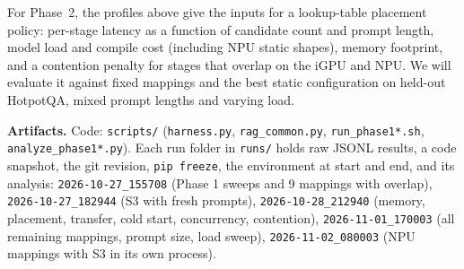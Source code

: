 \documentclass[10pt]{article}
\begin{document}
For Phase~2, the profiles above give the inputs for a lookup-table placement policy: per-stage latency as a
function of candidate count and prompt length, model load and compile cost (including NPU static shapes), memory
footprint, and a contention penalty for stages that overlap on the iGPU and NPU. We will evaluate it against fixed
mappings and the best static configuration on held-out HotpotQA, mixed prompt lengths and varying load.

\vspace{4pt}\noindent\footnotesize\textbf{Artifacts.} Code: \texttt{scripts/} (\texttt{harness.py}, \texttt{rag\_common.py},
\texttt{run\_phase1*.sh}, \texttt{analyze\_phase1*.py}). Each run folder in \texttt{runs/} holds raw JSONL results, a
code snapshot, the git revision, \texttt{pip freeze}, the environment at start and end, and its analysis:
\texttt{2026-10-27\_155708} (Phase 1 sweeps and 9 mappings with overlap),
\texttt{2026-10-27\_182944} (S3 with fresh prompts),
\texttt{2026-10-28\_212940} (memory, placement, transfer, cold start, concurrency, contention),
\texttt{2026-11-01\_170003} (all remaining mappings, prompt size, load sweep),
\texttt{2026-11-02\_080003} (NPU mappings with S3 in its own process).
\end{document}
